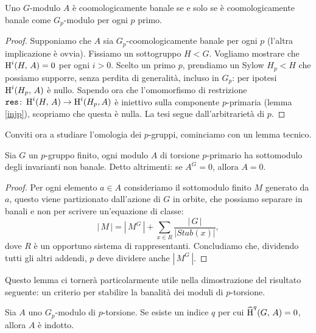 \begin{lemma}
	Uno $ G $-modulo $ A $ è coomologicamente banale se e solo se è coomologicamente banale come $ G_p $-modulo per ogni $ p $ primo.
\end{lemma}
\begin{proof}
	Supponiamo che $ A $ sia $ G_p $-coomologicamente banale per ogni $ p $ (l'altra implicazione è ovvia). Fissiamo un sottogruppo $ H < G $. Vogliamo mostrare che
	$  \operatorname{H}^i(H, \, A) = 0 $ per ogni $ i > 0 $. Scelto un primo $ p $, prendiamo un Sylow $ H_p < H $ che possiamo supporre, senza perdita di generalità, incluso in $ G_p $: per ipotesi $ \operatorname{H}^i(H_p, \, A) $ è nullo.
	Sapendo ora che l'omomorfismo di restrizione $ \operatorname{\mathtt{res}} \colon \operatorname{H}^i(H, \, A) \to \operatorname{H}^i(H_p, A) $ è iniettivo sulla componente $ p $-primaria (lemma \ref{injp}), scopriamo che questa è nulla. La tesi segue dall'arbitrarietà di $ p $.
	
\end{proof}

Conviti ora a studiare l'omologia dei $ p $-gruppi, 
cominciamo con un lemma tecnico.

\begin{lemma}\label{ban1}
	Sia $ G $ un $ p $-gruppo finito, ogni modulo $ A $ di torsione $ p $-primario ha sottomodulo degli invarianti non banale. Detto altrimenti: se $ A^G = 0 $, allora $ A = 0 $.
\end{lemma}
\begin{proof}
	Per ogni elemento $ a \in A $ consideriamo il sottomodulo finito $ M $ generato da $ a $, questo viene partizionato dall'azione di $ G $ in orbite, che possiamo separare in banali e non per scrivere un'equazione di classe:
	\[ |\,M\,| = |\, M^G\,| +\sum_{x \in R} \frac{|\,G\,|}{|Stab(x)|},  \]
	dove $ R $ è un opportuno sistema di rappresentanti. Concludiamo che, dividendo tutti gli altri addendi, $ p $ deve dividere anche $ |\, M^G \, | $.
\end{proof}

Questo lemma ci tornerà particolarmente utile nella dimostrazione del risultato seguente: un criterio per stabilire la banalità dei moduli di $ p $-torsione.

\begin{proposition} \label{ban2}
	Sia $ A $ uno $ G_p $-modulo di $ p $-torsione. Se esiste un indice $ q $ per cui $ \operatorname{\widehat{H}}^q(G, \, A) = 0 $, allora $ A $ è indotto.
\end{proposition}

